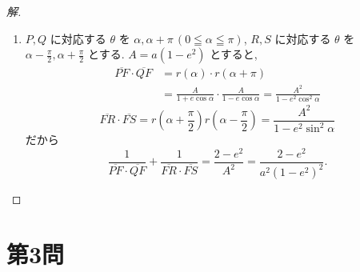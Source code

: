 \documentclass[../main.tex]{subfiles}
\begin{document}
\begin{proof}[解]
\begin{enumerate}
    \item[(2)] $P, Q$ に対応する $\theta$ を $\alpha, \alpha+\pi \, (0 \leqq \alpha \leqq \pi)$, $R, S$ に対応する $\theta$ を $\alpha-\frac{\pi}{2}, \alpha+\frac{\pi}{2}$ とする. $A = a(1-e^2)$ とすると,
      \begin{align*}
        \overline{PF} \cdot \overline{QF} &= r(\alpha) \cdot r(\alpha+\pi) \\
        &= \frac{A}{1+e\cos\alpha} \cdot \frac{A}{1-e\cos\alpha} = \frac{A^2}{1-e^2\cos^2\alpha}
      \end{align*}
      \[
        \overline{FR} \cdot \overline{FS} = r\left(\alpha+\frac{\pi}{2}\right) r\left(\alpha-\frac{\pi}{2}\right) = \frac{A^2}{1-e^2\sin^2\alpha}
      \]
      だから
      \[
        \frac{1}{\overline{PF}\cdot\overline{QF}} + \frac{1}{\overline{FR}\cdot\overline{FS}} = \frac{2-e^2}{A^2} = \frac{2-e^2}{a^2(1-e^2)^2}.
      \]
  \end{enumerate}
\end{proof}

\section*{第3問}
\end{document}
